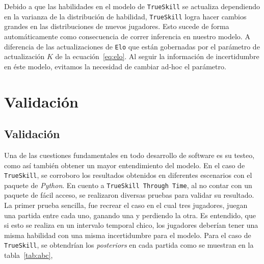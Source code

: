 \documentclass[11pt,twoside,spanish]{report} %
\begin{document}
Debido a que las habilidades en el modelo de \texttt{TrueSkill} se actualiza dependiendo en la varianza de la distribuci\'on de habilidad, \texttt{TrueSkill} logra hacer cambios grandes en las distribuciones de nuevos jugadores.
Esto sucede de forma autom\'aticamente como consecuencia de correr inferencia en nuestro modelo.
A diferencia de las actualizaciones de \texttt{Elo} que est\'an gobernadas por el par\'ametro de actualizaci\'on $K$ de la ecuaci\'on~\ref{eq:elo}.
Al seguir la informaci\'on de incertidumbre en \'este modelo, evitamos la necesidad de cambiar ad-hoc el par\'ametro.








\chapter{Validaci\'on}
%

\section{Validaci\'on}

Una de las cuestiones fundamentales en todo desarrollo de software es su testeo, como as\'i tambi\'en obtener un mayor entendimiento del modelo.
En el caso de \texttt{TrueSkill}, se corroboro los resultados obtenidos en diferentes escenarios con el paquete de \textit{Python}.
En cuento a \texttt{TrueSkill Through Time}, al no contar con un paquete de f\'acil acceso, se realizaron diversas pruebas para validar su resultado.
La primer prueba sencilla, fue recrear el caso en el cual tres jugadores, juegan una partida entre cada uno, ganando una y perdiendo la otra.
Es entendido, que si esto se realiza en un intervalo temporal chico, los jugadores deber\'ian tener una misma habilidad con una misma incertidumbre para el modelo.
Para el caso de \texttt{TrueSkill}, se obtendr\'ian los \textit{posteriors} en cada partida como se muestran en la tabla~\ref{tab:abc},
\end{document}
